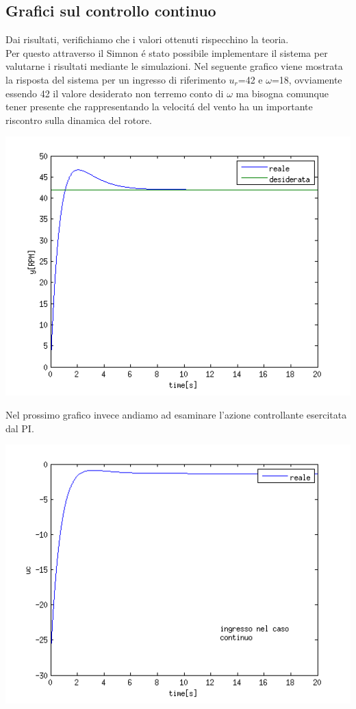 \documentclass[a4paper,13pt]{article}
\begin{document}
\subsection{Grafici sul controllo continuo}
Dai risultati, verifichiamo che i valori ottenuti rispecchino la teoria. \\
Per questo attraverso il Simnon \'e stato possibile implementare il sistema per valutarne i risultati mediante le simulazioni.
Nel seguente grafico viene mostrata la risposta del sistema per un ingresso di riferimento $u_r$=42 e
$\omega$=18, ovviamente essendo 42 il valore desiderato non terremo conto di $\omega$ ma bisogna comunque
tener presente che rappresentando la velocit\'a del vento ha un importante riscontro sulla dinamica del 
rotore.
\begin{center}
\includegraphics[scale=0.6]{graph/ycont.png}
\end{center}
Nel prossimo grafico invece andiamo ad esaminare l'azione controllante esercitata dal PI. 
\begin{center}
\includegraphics[scale=0.6]{graph/ucont.png}
\end{center}
\end{document}
